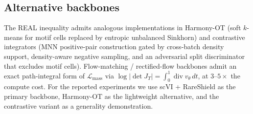 \subsection*{Alternative backbones}
The REAL inequality admits analogous implementations in Harmony-OT (soft $k$-means for motif cells replaced by entropic unbalanced Sinkhorn) and contrastive integrators (MNN positive-pair construction gated by cross-batch density support, density-aware negative sampling, and an adversarial split discriminator that excludes motif cells). Flow-matching / rectified-flow backbones admit an exact path-integral form of $\mathcal{L}_\text{mass}$ via $\log|\det J_T|=\int_0^1\operatorname{div}v_\theta\,dt$, at $3$--$5\times$ the compute cost. For the reported experiments we use scVI + RareShield as the primary backbone, Harmony-OT as the lightweight alternative, and the contrastive variant as a generality demonstration.
